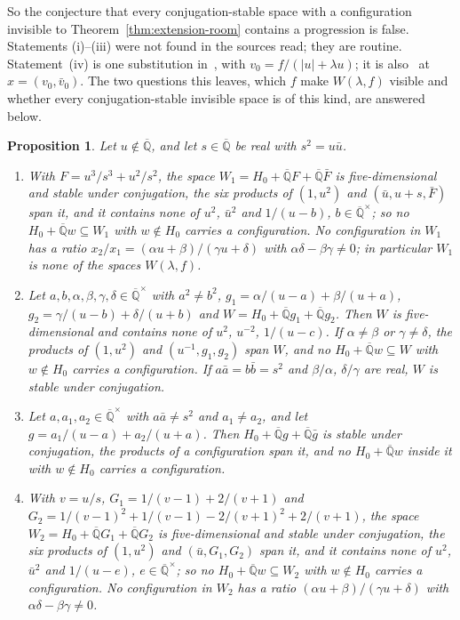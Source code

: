 \documentclass[11pt,a4paper]{article}
\theoremstyle{plain}
\newtheorem{proposition}[theorem]{Proposition}
\theoremstyle{definition}
\newcommand{\Alg}{\overline{\mathbb{Q}}}
\begin{document}
So the conjecture that every conjugation-stable space with a configuration invisible to
Theorem~\ref{thm:extension-room} contains a progression is false. Statements (i)--(iii) were not found in the sources
read; they are routine. Statement~(iv) is one substitution in~\cite[Th\'eor\`eme~7(1)]{diaz-2007}, with
$v_{0}=f/(|u|+\lambda u)$; it is also~\cite[Th\'eor\`eme~2]{diaz-2004} at $x=(v_{0},\bar v_{0})$. The two
questions this leaves, which $f$ make $W(\lambda,f)$ visible and whether every conjugation-stable invisible space
is of this kind, are answered below.

\begin{proposition}\label{prop:beyond-degree-one}
Let $u\notin\Alg$, and let $s\in\Alg$ be real with $s^{2}=u\bar u$.
\begin{enumerate}[label=\textup{(\roman*)}]
\item With $F=u^{3}/s^{3}+u^{2}/s^{2}$, the space $W_{1}=H_{0}+\Alg F+\Alg\bar F$ is five-dimensional and stable under
conjugation, the six products of $(1,u^{2})$ and $(\bar u,u+s,\bar F)$ span it, and it contains none of $u^{2}$,
$\bar u^{2}$ and $1/(u-b)$, $b\in\Alg^{\times}$; so no $H_{0}+\Alg w\subseteq W_{1}$ with $w\notin H_{0}$ carries a
configuration. No configuration in $W_{1}$ has a ratio $x_{2}/x_{1}=(\alpha u+\beta)/(\gamma u+\delta)$ with
$\alpha\delta-\beta\gamma\neq0$; in particular $W_{1}$ is none of the spaces $W(\lambda,f)$.
\item Let $a,b,\alpha,\beta,\gamma,\delta\in\Alg^{\times}$ with $a^{2}\neq b^{2}$, $g_{1}=\alpha/(u-a)+\beta/(u+a)$,
$g_{2}=\gamma/(u-b)+\delta/(u+b)$ and $W=H_{0}+\Alg g_{1}+\Alg g_{2}$. Then $W$ is five-dimensional and contains none of
$u^{2}$, $u^{-2}$, $1/(u-c)$. If $\alpha\neq\beta$ or $\gamma\neq\delta$, the products of $(1,u^{2})$ and
$(u^{-1},g_{1},g_{2})$ span $W$, and no $H_{0}+\Alg w\subseteq W$ with $w\notin H_{0}$ carries a configuration. If
$a\bar a=b\bar b=s^{2}$ and $\beta/\alpha$, $\delta/\gamma$ are real, $W$ is stable under conjugation.
\item Let $a,a_{1},a_{2}\in\Alg^{\times}$ with $a\bar a\neq s^{2}$ and $a_{1}\neq a_{2}$, and let
$g=a_{1}/(u-a)+a_{2}/(u+a)$. Then $H_{0}+\Alg g+\Alg\bar g$ is stable under conjugation, the products of a
configuration span it, and no $H_{0}+\Alg w$ inside it with $w\notin H_{0}$ carries a configuration.
\item With $v=u/s$, $G_{1}=1/(v-1)+2/(v+1)$ and $G_{2}=1/(v-1)^{2}+1/(v-1)-2/(v+1)^{2}+2/(v+1)$, the space
$W_{2}=H_{0}+\Alg G_{1}+\Alg G_{2}$ is five-dimensional and stable under conjugation, the six products of
$(1,u^{2})$ and $(\bar u,G_{1},G_{2})$ span it, and it contains none of $u^{2}$, $\bar u^{2}$ and $1/(u-e)$,
$e\in\Alg^{\times}$; so no $H_{0}+\Alg w\subseteq W_{2}$ with $w\notin H_{0}$ carries a configuration. No
configuration in $W_{2}$ has a ratio $(\alpha u+\beta)/(\gamma u+\delta)$ with $\alpha\delta-\beta\gamma\neq0$.
\end{enumerate}
\end{proposition}
\end{document}
